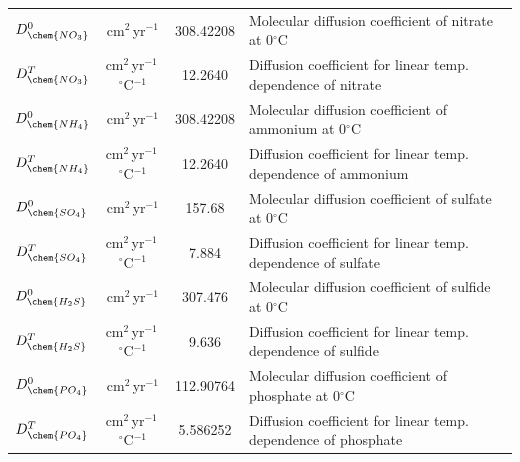 \documentclass[gmd, manuscript]{copernicus}
\begin{document}
\begin{table}[hbtp]
\begin{tabular}{l c c l}
$D_{\chem{NO_3}}^0$ & cm$^2$\,yr$^{-1}$ & 308.42208 &Molecular diffusion coefficient of nitrate at 0$^\circ$C\\
$D_{\chem{NO_3}}^T$ & cm$^2$\,yr$^{-1}$\,${}^{\circ}$C$^{-1}$ & 12.2640 &Diffusion coefficient for linear temp. dependence of nitrate\\ %
$D_{\chem{NH_4}}^0$ & cm$^2$\,yr$^{-1}$ & 308.42208 &Molecular diffusion coefficient of ammonium at 0$^\circ$C\\
$D_{\chem{NH_4}}^T$ & cm$^2$\,yr$^{-1}$\,${}^{\circ}$C$^{-1}$ & 12.2640 &Diffusion coefficient for linear temp. dependence of ammonium\\ %
$D_{\chem{SO_4}}^0$ & cm$^2$\,yr$^{-1}$ & 157.68 &Molecular diffusion coefficient of sulfate at 0$^\circ$C\\
$D_{\chem{SO_4}}^T$ & cm$^2$\,yr$^{-1}$\,${}^{\circ}$C$^{-1}$ & 7.884 &Diffusion coefficient for linear temp. dependence of sulfate\\ %
$D_{\chem{H_2S}}^0$ & cm$^2$\,yr$^{-1}$ & 307.476 & Molecular diffusion coefficient of sulfide at 0$^\circ$C\\
$D_{\chem{H_2S}}^T$ & cm$^2$\,yr$^{-1}$\,${}^{\circ}$C$^{-1}$ & 9.636 & Diffusion coefficient for linear temp. dependence of sulfide\\ %
$D_{\chem{PO_4}}^0$ & cm$^2$\,yr$^{-1}$ & 112.90764 &Molecular diffusion coefficient of phosphate at 0$^\circ$C\\
$D_{\chem{PO_4}}^T$ & cm$^2$\,yr$^{-1}$\,${}^{\circ}$C$^{-1}$ & 5.586252 &Diffusion coefficient for linear temp. dependence of phosphate\\ %
\hline\hline
\end{tabular}
\label{table:sed-charac_transport-parameters}
\end{table}
\end{document}
